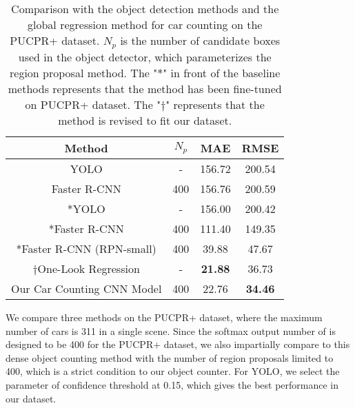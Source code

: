 \documentclass[10pt,twocolumn,letterpaper]{article}
\begin{document}
\begin{table}[h]
	\caption{Comparison with the object detection methods and the global regression method for car counting on the PUCPR+ dataset. $N_{p}$ is the number of candidate boxes used in the object detector, which parameterizes the region proposal method. The "$*$" in front of the baseline methods represents that the method has been fine-tuned on PUCPR+ dataset. The "$\dagger$" represents that the method is revised to fit our dataset.}
	\vspace{-0.5 cm}
\begin{center}
\begin{tabular}{|c|c|c|c|}
\hline
Method & $N_{p}$ & MAE  & RMSE \\
\hline\hline
YOLO \cite{43_redmon2016you}		  & - & 156.72 & 200.54 \\
\hline
Faster R-CNN \cite{21_ren2015faster}  & 400 & 156.76 & 200.59 \\
\hline\hline
*YOLO 		  						  & - & 156.00 & 200.42 \\
\hline
*Faster R-CNN  						  & 400 & 111.40 & 149.35 \\
\hline
*Faster R-CNN (RPN-small)  			  & 400 & 39.88 &  47.67\\
\hline
$\dagger$One-Look Regression \cite{04_mundhenk2016large}  & - & \textbf{21.88} & 36.73 \\
\hline
Our Car Counting CNN Model 			  & 400 & 22.76 & \textbf{34.46} \\
\hline
\end{tabular}
\end{center}
\label{table:t4}
\end{table}
\vspace{-0.5 cm}

We compare three methods on the PUCPR+ dataset, where the maximum number of cars is 311 in a single scene. Since the softmax output number of \cite{04_mundhenk2016large} is designed to be 400 for the PUCPR+ dataset, we also impartially compare to this dense object counting method with the number of region proposals limited to 400, which is a strict condition to our object counter. For YOLO, we select the parameter of confidence threshold at 0.15, which gives the best performance in our dataset. 
\end{document}
